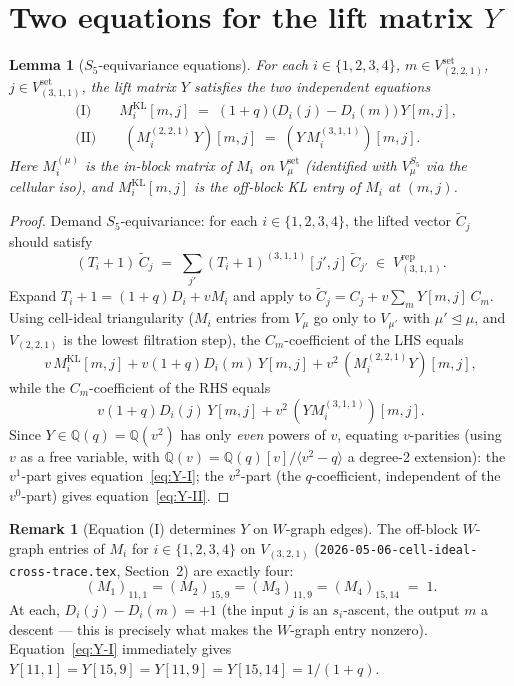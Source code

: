 \documentclass[11pt]{article}
\newtheorem{lemma}[theorem]{Lemma}
\theoremstyle{definition}
\newtheorem{remark}[theorem]{Remark}
\begin{document}
\section{Two equations for the lift matrix $Y$}\label{sec:off-block}

\begin{lemma}[$S_5$-equivariance equations]\label{lem:eq-Y}
For each $i \in \{1, 2, 3, 4\}$, $m \in V_{(2,2,1)}^{\mathrm{set}}$, $j \in V_{(3,1,1)}^{\mathrm{set}}$, the lift matrix $Y$ satisfies the two independent equations
\begin{align}
&\text{(I)} \qquad M_i^{\mathrm{KL}}[m, j] \;=\; (1+q)\bigl(D_i(j) - D_i(m)\bigr)\,Y[m, j], \label{eq:Y-I}\\
&\text{(II)} \qquad (M_i^{(2,2,1)} \, Y)[m, j] \;=\; (Y \, M_i^{(3,1,1)})[m, j]. \label{eq:Y-II}
\end{align}
Here $M_i^{(\mu)}$ is the in-block matrix of $M_i$ on $V_\mu^{\mathrm{set}}$ (identified with $V_\mu^{S_5}$ via the cellular iso), and $M_i^{\mathrm{KL}}[m, j]$ is the off-block KL entry of $M_i$ at $(m, j)$.
\end{lemma}

\begin{proof}
Demand $S_5$-equivariance: for each $i \in \{1, 2, 3, 4\}$, the lifted vector $\widetilde C_j$ should satisfy
\[
(T_i + 1)\, \widetilde C_j \;=\; \sum_{j'} (T_i+1)^{(3,1,1)}[j', j]\, \widetilde C_{j'} \;\in\; V_{(3,1,1)}^{\mathrm{rep}}.
\]
Expand $T_i + 1 = (1+q)D_i + vM_i$ and apply to $\widetilde C_j = C_j + v\sum_m Y[m, j]\, C_m$. Using cell-ideal triangularity ($M_i$ entries from $V_\mu$ go only to $V_{\mu'}$ with $\mu' \trianglelefteq \mu$, and $V_{(2,2,1)}$ is the lowest filtration step), the $C_m$-coefficient of the LHS equals
\[
v\, M_i^{\mathrm{KL}}[m, j] + v(1+q) D_i(m)\, Y[m, j] + v^2\, (M_i^{(2,2,1)} Y)[m, j],
\]
while the $C_m$-coefficient of the RHS equals
\[
v(1+q) D_i(j)\, Y[m, j] + v^2\, (Y M_i^{(3,1,1)})[m, j].
\]
Since $Y \in \mathbb{Q}(q) = \mathbb{Q}(v^2)$ has only \emph{even} powers of $v$, equating $v$-parities (using $v$ as a free variable, with $\mathbb{Q}(v) = \mathbb{Q}(q)[v] / \langle v^2 - q\rangle$ a degree-2 extension): the $v^1$-part gives equation~\eqref{eq:Y-I}; the $v^2$-part (the $q$-coefficient, independent of the $v^0$-part) gives equation~\eqref{eq:Y-II}. \qedhere
\end{proof}

\begin{remark}[Equation (I) determines $Y$ on $W$-graph edges]\label{rem:eq-I}
The off-block $W$-graph entries of $M_i$ for $i \in \{1, 2, 3, 4\}$ on $V_{(3,2,1)}$ (\texttt{2026-05-06-cell-ideal-cross-trace.tex}, Section~2) are exactly four:
\[
(M_1)_{11, 1} = (M_2)_{15, 9} = (M_3)_{11, 9} = (M_4)_{15, 14} \;=\; 1.
\]
At each, $D_i(j) - D_i(m) = +1$ (the input $j$ is an $s_i$-ascent, the output $m$ a descent --- this is precisely what makes the $W$-graph entry nonzero). Equation~\eqref{eq:Y-I} immediately gives $Y[11,1] = Y[15,9] = Y[11,9] = Y[15,14] = 1/(1+q)$.
\end{remark}
\end{document}

